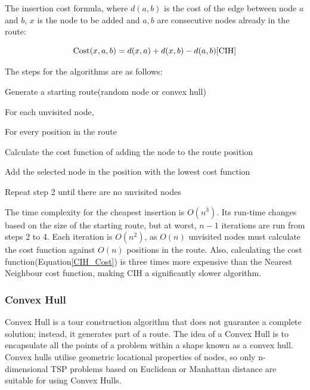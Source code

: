 The insertion cost formula, where \(d(a,b)\) is the cost of the edge between node $a$ and $b$, \(x\) is the node to be added and \(a,b\) are consecutive nodes already in the route\cite{Rosenkrantz2009}:

\begin{equation}
    \text{Cost}(x,a,b) = d(x,a) + d(x,b) - d(a,b)  
    \label{CIH_Cost}
\cite{CIH}
\end{equation}

The steps for the algorithms are as follows\cite{CIH}\cite{Rosenkrantz2009}:

\begin{legal}
  \item Generate a starting route(random node or convex hull)
  \item For each unvisited node,
    \begin{legal}
        \item For every position in the route
        \begin{legal}
            \item Calculate the cost function of adding the node to the route position
        \end{legal}
    \end{legal}
  \item Add the selected node in the position with the lowest cost function
  \item Repeat step 2 until there are no unvisited nodes
\end{legal}

The time complexity for the cheapest insertion is \(O(n^3)\)\cite{Christian-tsp}. Its run-time changes based on the size of the starting route, but at worst, \(n-1\) iterations are run from steps 2 to 4. Each iteration is \(O(n^2)\), as \(O(n)\) unvisited nodes must calculate the cost function against \(O(n)\) positions in the route. Also, calculating the cost function(Equation\ref{CIH_Cost}) is three times more expensive than the Nearest Neighbour cost function, making CIH a significantly slower algorithm. 

\subsubsection{Convex Hull}

Convex Hull is a tour construction algorithm that does not guarantee a complete solution; instead, it generates part of a route\cite{MEERAN1997737}. The idea of a Convex Hull is to encapsulate all the points of a problem within a shape known as a convex hull\cite{lay1982convex}. Convex hulls utilise geometric locational properties of nodes, so only n-dimensional TSP problems based on Euclidean or Manhattan distance are suitable for using Convex Hulls\cite{MEERAN1997737}. 

